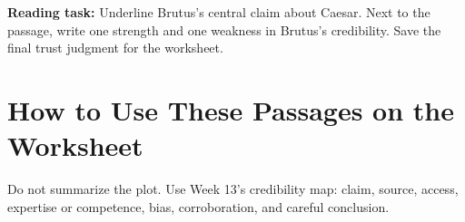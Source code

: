 \documentclass[12pt]{article}
\begin{document}
\textbf{Reading task:} Underline Brutus's central claim about Caesar. Next to the passage, write one strength and one weakness in Brutus's credibility. Save the final trust judgment for the worksheet.

\section*{How to Use These Passages on the Worksheet}

Do not summarize the plot. Use Week 13's credibility map: claim, source, access, expertise or competence, bias, corroboration, and careful conclusion.
\end{document}
